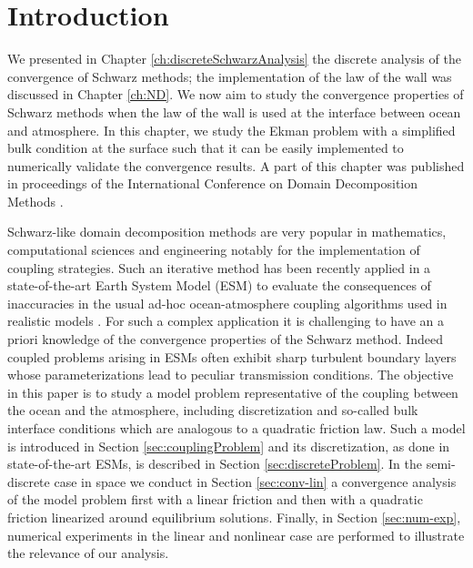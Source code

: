

\section{Introduction}
We presented in Chapter \ref{ch:discreteSchwarzAnalysis}
the discrete analysis of the convergence of Schwarz methods;
the implementation of the law of the wall was discussed
in Chapter \ref{ch:ND}. We now aim to study the convergence
properties of Schwarz methods when the law of the wall is
used at the interface between ocean and atmosphere.
In this chapter, we study the Ekman problem with a
simplified bulk condition at the surface such that
it can be easily implemented to numerically validate the
convergence results.
A part of this chapter was published in proceedings of the
International Conference on Domain Decomposition Methods
\citep{clement_discrete_2021}.

Schwarz-like domain decomposition methods are very popular in 
mathematics, computational sciences and engineering notably for 
the implementation of coupling strategies. Such an iterative method
has been recently applied in a state-of-the-art Earth 
System Model (ESM) to evaluate the consequences of inaccuracies 
in the usual ad-hoc ocean-atmosphere coupling algorithms 
used in realistic models \cite{marti_schwarz_2021}. For such 
a complex application it is challenging to have an a priori 
knowledge of the convergence properties of the Schwarz method. 
Indeed coupled problems arising in ESMs often 
exhibit sharp turbulent boundary layers whose parameterizations 
lead to peculiar transmission conditions. The objective in
this paper is to study a model problem representative 
of the coupling between the ocean and the atmosphere, including discretization 
and so-called bulk interface conditions which are analogous to a 
quadratic friction law. Such a model is introduced in Section \ref{sec:couplingProblem}
and its discretization, as done in state-of-the-art ESMs, 
is described in Section \ref{sec:discreteProblem}. In the semi-discrete
case in space we conduct in Section \ref{sec:conv-lin} a convergence analysis 
of the model problem first with a linear friction and then with a 
quadratic friction linearized around equilibrium solutions. 
Finally, in Section \ref{sec:num-exp}, numerical experiments in the 
linear and nonlinear case are performed to illustrate the relevance 
of our analysis. \par
%
